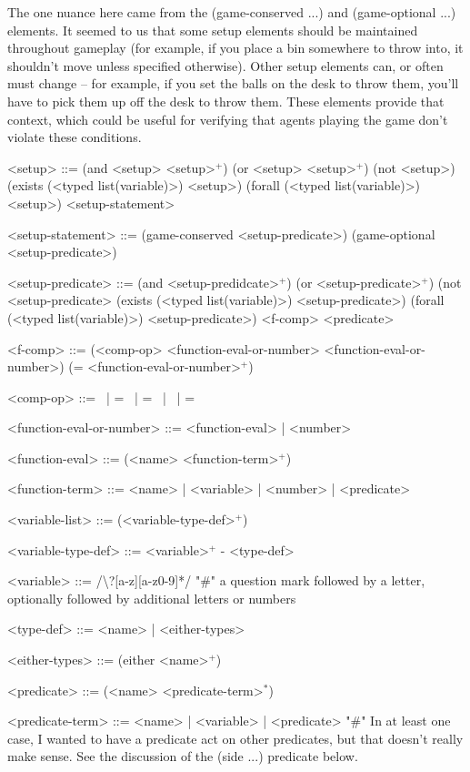 \documentclass{article}
\begin{document}
        The one nuance here came from the (game-conserved ...) and (game-optional ...) elements. It seemed to us that some setup elements should be maintained
        throughout gameplay (for example, if you place a bin somewhere to throw into, it shouldn't move unless specified otherwise).
        Other setup elements can, or often must change -- for example, if you set the balls on the desk to throw them, you'll have to pick them up off the desk to throw them.
        These elements provide that context, which could be useful for verifying that agents playing the game don't violate these conditions.

\begin{grammar}
<setup> ::= (and <setup> <setup>$^+$) \alt
    (or <setup> <setup>$^+$) \alt
    (not <setup>) \alt
    (exists (<typed list(variable)>) <setup>) \alt
    (forall (<typed list(variable)>) <setup>) \alt
    <setup-statement>

<setup-statement> ::= (game-conserved <setup-predicate>) \alt
    (game-optional <setup-predicate>)

<setup-predicate> ::= (and <setup-predidcate>$^+$) \alt
    (or <setup-predicate>$^+$) \alt
    (not <setup-predicate> \alt
    (exists (<typed list(variable)>) <setup-predicate>) \alt
    (forall (<typed list(variable)>) <setup-predicate>) \alt
    <f-comp> \alt
    <predicate>


<f-comp> ::= (<comp-op> <function-eval-or-number> <function-eval-or-number>) \alt
    (= <function-eval-or-number>$^+$)

<comp-op> ::=  \textlangle \ | \textlangle = \ | = \ | \textrangle \ | \textrangle =

<function-eval-or-number> ::= <function-eval> | <number>

<function-eval> ::= (<name> <function-term>$^+$)

<function-term> ::= <name> | <variable> | <number> | <predicate>

<variable-list> ::= (<variable-type-def>$^+$)

<variable-type-def> ::= <variable>$^+$ - <type-def>

<variable> ::= /\textbackslash?[a-z][a-z0-9]*/  "#" a question mark followed by a letter, optionally followed by additional letters or numbers

<type-def> ::= <name> | <either-types>

<either-types> ::= (either <name>$^+$)

<predicate> ::= (<name> <predicate-term>$^*$)

<predicate-term> ::= <name> | <variable> | <predicate> "#" In at least one case, I wanted to have a predicate act on other predicates, but that doesn't really make sense. See the discussion of the (side ...) predicate below.


\end{grammar}
\end{document}
